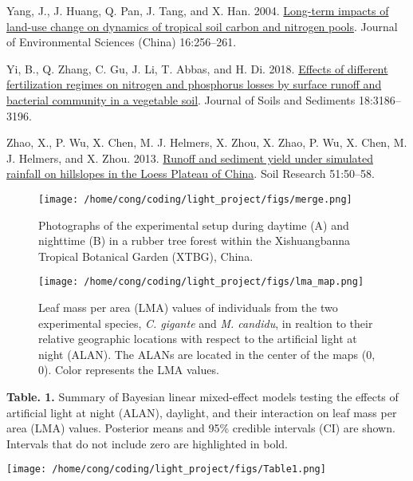 \documentclass[
  12pt,
  letterpaper,
  DIV=11,
  numbers=noendperiod]{scrartcl}
\newlength{\cslhangindent}
\newlength{\cslentryspacingunit} %
\newenvironment{CSLReferences}[2] %
 {%
  \setlength{\parindent}{0pt}
  \ifodd #1
  \let\oldpar\par
  \def\par{\hangindent=\cslhangindent\oldpar}
  \fi
  \setlength{\parskip}{#2\cslentryspacingunit}
 }%
 {}
\begin{document}
\begin{CSLReferences}{1}{0}
\leavevmode{}%
Yang, J., J. Huang, Q. Pan, J. Tang, and X. Han. 2004.
\href{https://www.ncbi.nlm.nih.gov/pubmed/15137650}{Long-term impacts of
land-use change on dynamics of tropical soil carbon and nitrogen pools}.
Journal of Environmental Sciences (China) 16:256--261.

\leavevmode{}%
Yi, B., Q. Zhang, C. Gu, J. Li, T. Abbas, and H. Di. 2018.
\href{https://doi.org/10.1007/s11368-018-1991-6}{Effects of different
fertilization regimes on nitrogen and phosphorus losses by surface
runoff and bacterial community in a vegetable soil}. Journal of Soils
and Sediments 18:3186--3196.

\leavevmode{}%
Zhao, X., P. Wu, X. Chen, M. J. Helmers, X. Zhou, X. Zhao, P. Wu, X.
Chen, M. J. Helmers, and X. Zhou. 2013.
\href{https://doi.org/10.1071/SR12239}{Runoff and sediment yield under
simulated rainfall on hillslopes in the {Loess Plateau} of {China}}.
Soil Research 51:50--58.

\end{CSLReferences}

\newpage

\begin{figure}

{\centering \texttt{[image: /home/cong/coding/light\_project/figs/merge.png]}

}

\caption{\label{fig-alan}Photographs of the experimental setup during
daytime (A) and nighttime (B) in a rubber tree forest within the
Xishuangbanna Tropical Botanical Garden (XTBG), China.}

\end{figure}

\newpage

\begin{figure}

{\centering \texttt{[image: /home/cong/coding/light\_project/figs/lma\_map.png]}

}

\caption{\label{fig-LMA}Leaf mass per area (LMA) values of individuals
from the two experimental species, \emph{C. gigante} and \emph{M.
candidu}, in realtion to their relative geographic locations with
respect to the artificial light at night (ALAN). The ALANs are located
in the center of the maps (0, 0). Color represents the LMA values.}

\end{figure}

\newpage

\textbf{Table. 1.} Summary of Bayesian linear mixed-effect models
testing the effects of artificial light at night (ALAN), daylight, and
their interaction on leaf mass per area (LMA) values. Posterior means
and 95\% credible intervals (CI) are shown. Intervals that do not
include zero are highlighted in bold.

\texttt{[image: /home/cong/coding/light\_project/figs/Table1.png]}
\end{document}
